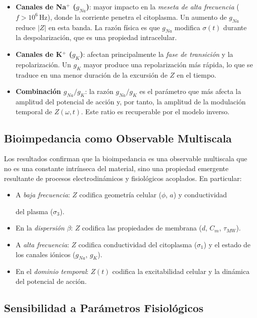 \documentclass[12pt]{article}
\begin{document}
\begin{itemize}
\item \textbf{Canales de Na$^+$ ($g_{Na}$)}: mayor impacto en la \emph{meseta de alta
frecuencia} ($f > 10^6\,\text{Hz}$), donde la corriente penetra el citoplasma. Un
aumento de $g_{Na}$ reduce $|Z|$ en esta banda. La raz\'on f\'isica es que $g_{Na}$
modifica $\sigma(t)$ durante la despolarizaci\'on, que es una propiedad intracelular.
\item \textbf{Canales de K$^+$ ($g_K$)}: afectan principalmente la \emph{fase de
transici\'on} y la repolarizaci\'on. Un $g_K$ mayor produce una repolarizaci\'on m\'as
r\'apida, lo que se traduce en una menor duraci\'on de la excursi\'on de $Z$ en el tiempo.
\item \textbf{Combinaci\'on $g_{Na}/g_K$}: la raz\'on $g_{Na}/g_K$ es el par\'ametro que
m\'as afecta la amplitud del potencial de acci\'on y, por tanto, la amplitud de la
modulaci\'on temporal de $Z(\omega, t)$. Este ratio es recuperable por el modelo inverso.
\end{itemize}

\subsection{Bioimpedancia como Observable Multiscala}

Los resultados confirman que la bioimpedancia es una observable multiscala que no es una
constante intr\'inseca del material, sino una propiedad emergente resultante de procesos
electrodin\'amicos y fisiol\'ogicos acoplados. En particular:

\begin{itemize}
\item A \emph{baja frecuencia}: $Z$ codifica geometr\'ia celular ($\phi$, $a$) y conductividad

del plasma ($\sigma_3$).
\item En la \emph{dispersi\'on $\beta$}: $Z$ codifica las propiedades de membrana ($d$,
$C_m$, $\tau_{MW}$).
\item A \emph{alta frecuencia}: $Z$ codifica conductividad del citoplasma ($\sigma_1$) y
el estado de los canales i\'onicos ($g_{Na}$, $g_K$).
\item En el \emph{dominio temporal}: $Z(t)$ codifica la excitabilidad celular y la
din\'amica del potencial de acci\'on.
\end{itemize}

\subsection{Sensibilidad a Par\'ametros Fisiol\'ogicos}
\end{document}
